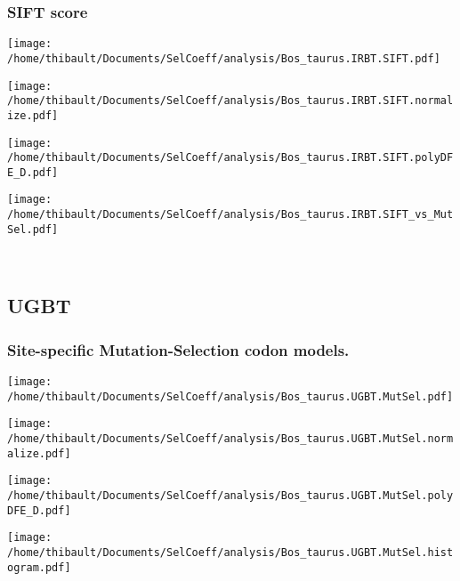 \subsubsection*{SIFT score} 
\begin{minipage}{0.49\linewidth} 
\texttt{[image: /home/thibault/Documents/SelCoeff/analysis/Bos\_taurus.IRBT.SIFT.pdf]} 
\end{minipage}
\begin{minipage}{0.49\linewidth} 
\texttt{[image: /home/thibault/Documents/SelCoeff/analysis/Bos\_taurus.IRBT.SIFT.normalize.pdf]} 
\end{minipage}
\begin{minipage}{0.49\linewidth} 
\texttt{[image: /home/thibault/Documents/SelCoeff/analysis/Bos\_taurus.IRBT.SIFT.polyDFE\_D.pdf]} 
\end{minipage}
\begin{minipage}{0.49\linewidth} 
\texttt{[image: /home/thibault/Documents/SelCoeff/analysis/Bos\_taurus.IRBT.SIFT\_vs\_MutSel.pdf]} 
\end{minipage}
\\ 
\subsection{UGBT} 
 
\subsubsection*{Site-specific Mutation-Selection codon models.} 
\begin{minipage}{0.49\linewidth} 
\texttt{[image: /home/thibault/Documents/SelCoeff/analysis/Bos\_taurus.UGBT.MutSel.pdf]} 
\end{minipage}
\begin{minipage}{0.49\linewidth} 
\texttt{[image: /home/thibault/Documents/SelCoeff/analysis/Bos\_taurus.UGBT.MutSel.normalize.pdf]} 
\end{minipage}
\begin{minipage}{0.49\linewidth} 
\texttt{[image: /home/thibault/Documents/SelCoeff/analysis/Bos\_taurus.UGBT.MutSel.polyDFE\_D.pdf]} 
\end{minipage}
\begin{minipage}{0.49\linewidth} 
\texttt{[image: /home/thibault/Documents/SelCoeff/analysis/Bos\_taurus.UGBT.MutSel.histogram.pdf]} 
\end{minipage}
\\ 
